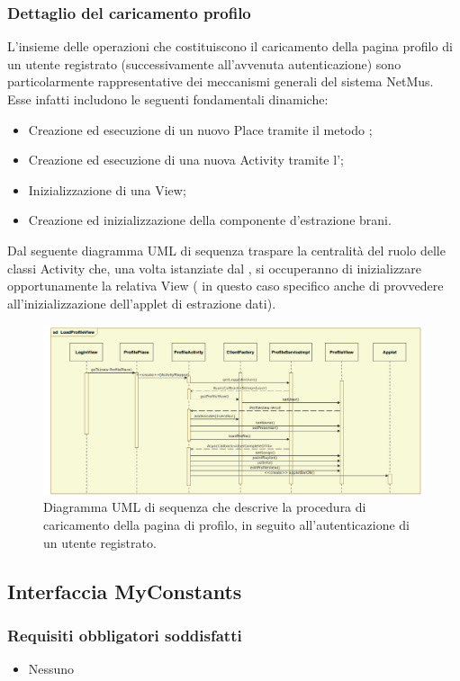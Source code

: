 \subsubsection*{Dettaglio del caricamento profilo}
L'insieme delle operazioni che costituiscono il caricamento della pagina profilo
di un utente registrato (successivamente all'avvenuta autenticazione) sono
particolarmente rappresentative dei meccanismi generali del sistema NetMus. Esse
infatti includono le seguenti fondamentali dinamiche:
\begin{itemize}
  \item Creazione ed esecuzione di un nuovo Place tramite il metodo ;
  \item Creazione ed esecuzione di una nuova Activity tramite
  l';
  \item Inizializzazione di una View;
  \item Creazione ed inizializzazione della componente d'estrazione brani.
\end{itemize}
Dal seguente diagramma UML di sequenza traspare la centralit\`a del
ruolo delle classi Activity che, una volta istanziate dal
, si occuperanno di inizializzare opportunamente la
relativa View ( in questo caso specifico anche di provvedere
all'inizializzazione dell'applet di estrazione dati).

\begin{figure}[!h]
  \centering
  \includegraphics[width=17cm]{img/DP/loadProfileView.png}
\caption{Diagramma UML di sequenza che descrive la procedura di caricamento
della pagina di profilo, in seguito all'autenticazione di un utente registrato.}
\end{figure}

\subsection{Interfaccia MyConstants}
\subsubsection*{Requisiti obbligatori soddisfatti}
\begin{itemize}
    \item Nessuno
\end{itemize}
